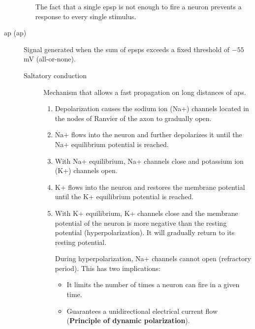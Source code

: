 \begin{description}
\begin{itemize}
                \begin{remark}
                    The fact that a single \ac{epsp} is not enough to fire a neuron prevents a response to every single stimulus.
                \end{remark}
        \end{itemize}

    \item[\Acl{ap} (\ac{ap})] 
        Signal generated when the sum of \acp{epsp} exceeds a fixed threshold of $-55$mV (all-or-none).

        \begin{description}
            \item[Saltatory conduction] 
                Mechanism that allows a fast propagation on long distances of \acp{ap}.
                \begin{enumerate}
                    \item Depolarization causes the sodium ion (Na+) channels located in the nodes of Ranvier of the axon to gradually open.
                    \item Na+ flows into the neuron and further depolarizes it until the Na+ equilibrium potential is reached.
                    \item With Na+ equilibrium, Na+ channels close and potassium ion (K+) channels open.
                    \item K+ flows into the neuron and restores the membrane potential until the K+ equilibrium potential is reached.
                    \item With K+ equilibrium, K+ channels close and 
                        the membrane potential of the neuron is more negative than the resting potential (hyperpolarization).
                        It will gradually return to its resting potential.
                        \begin{remark}
                            During hyperpolarization, Na+ channels cannot open (refractory period).
                            This has two implications:
                            \begin{itemize}
                                \item It limits the number of times a neuron can fire in a given time.
                                \item Guarantees a unidirectional electrical current flow 
                                    (\textbf{Principle of dynamic polarization}). 
                            \end{itemize}
                        \end{remark}
                \end{enumerate}


\end{description}
\end{description}
